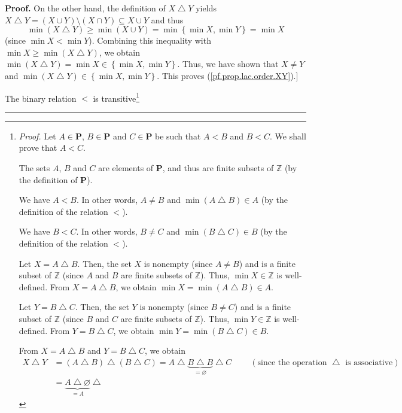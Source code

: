 \documentclass[numbers=enddot,12pt,final,onecolumn,notitlepage]{scrartcl}%
\theoremstyle{definition}
\newenvironment{proof}[1][Proof]{\noindent\textbf{#1.} }{\ \rule{0.5em}{0.5em}}
\newenvironment{verlong}{}{}
\begin{document}
\begin{verlong}
\begin{proof}
On the other hand, the definition of $X\bigtriangleup Y$ yields
$X\bigtriangleup Y=\left(  X\cup Y\right)  \setminus\left(  X\cap Y\right)
\subseteq X\cup Y$ and thus%
\[
\min\left(  X\bigtriangleup Y\right)  \geq\min\left(  X\cup Y\right)
=\min\left\{  \min X,\min Y\right\}  =\min X
\]
(since $\min X<\min Y$).
Combining this inequality with $\min X\geq\min\left(  X\bigtriangleup
Y\right)  $, we obtain $\min\left(  X\bigtriangleup Y\right)  =\min
X\in\left\{  \min X,\min Y\right\}  $. Thus, we have shown that $X\neq Y$ and
$\min\left(  X\bigtriangleup Y\right)  \in\left\{  \min X,\min Y\right\}  $.
This proves (\ref{pf.prop.lac.order.XY}).]

The binary relation $<$ is transitive\footnote{\textit{Proof.} Let
$A\in\mathbf{P}$, $B\in\mathbf{P}$ and $C\in\mathbf{P}$ be such that $A<B$ and
$B<C$. We shall prove that $A<C$.
\par
The sets $A$, $B$ and $C$ are elements of $\mathbf{P}$, and thus are finite
subsets of $\mathbb{Z}$ (by the definition of $\mathbf{P}$).
\par
We have $A<B$. In other words, $A\neq B$ and $\min\left(  A\bigtriangleup
B\right)  \in A$ (by the definition of the relation $<$).
\par
We have $B<C$. In other words, $B\neq C$ and $\min\left(  B\bigtriangleup
C\right)  \in B$ (by the definition of the relation $<$).
\par
Let $X=A\bigtriangleup B$. Then, the set $X$ is nonempty (since $A\neq B$) and
is a finite subset of $\mathbb{Z}$ (since $A$ and $B$ are finite subsets of
$\mathbb{Z}$). Thus, $\min X\in\mathbb{Z}$ is well-defined. From
$X=A\bigtriangleup B$, we obtain $\min X=\min\left(  A\bigtriangleup B\right)
\in A$.
\par
Let $Y=B\bigtriangleup C$. Then, the set $Y$ is nonempty (since $B\neq C$) and
is a finite subset of $\mathbb{Z}$ (since $B$ and $C$ are finite subsets of
$\mathbb{Z}$). Thus, $\min Y\in\mathbb{Z}$ is well-defined. From
$Y=B\bigtriangleup C$, we obtain $\min Y=\min\left(  B\bigtriangleup C\right)
\in B$.
\par
From $X=A\bigtriangleup B$ and $Y=B\bigtriangleup C$, we obtain%
\begin{align*}
X\bigtriangleup Y  &  =\left(  A\bigtriangleup B\right)  \bigtriangleup\left(
B\bigtriangleup C\right)  =A\bigtriangleup\underbrace{B\bigtriangleup
B}_{=\varnothing}\bigtriangleup C\ \ \ \ \ \ \ \ \ \ \left(  \text{since the
operation }\bigtriangleup\text{ is associative}\right) \\
&  =\underbrace{A\bigtriangleup\varnothing}_{=A}\bigtriangleup

\end{align*}}
\end{proof}
\end{verlong}
\end{document}
